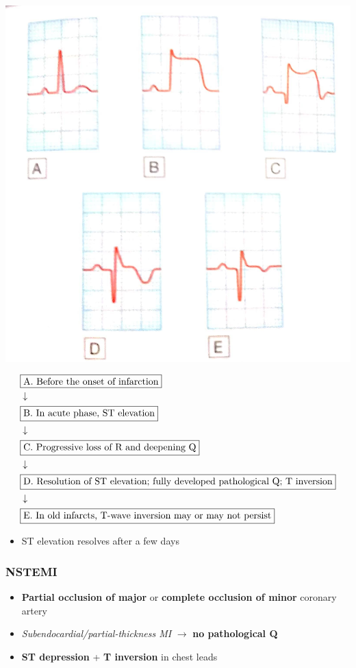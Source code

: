 \documentclass[
  12pt,
]{memoir}
\providecommand{\tightlist}{%
  \setlength{\itemsep}{0pt}\setlength{\parskip}{0pt}}
\begin{document}
\includegraphics[width=.5\textwidth]{../assets/med/STEMI.jpg}

\[
\begin{aligned}
&\fbox{A. Before the onset of infarction}\\
&\downarrow\\
&\fbox{B. In acute phase, ST elevation}\\
&\downarrow\\
&\fbox{C. Progressive loss of R and deepening Q}\\
&\downarrow\\
&\fbox{D. Resolution of ST elevation; fully developed pathological Q;
T inversion}\\
&\downarrow\\
&\fbox{E. In old infarcts, T-wave inversion may or may not persist}\\
\end{aligned}
\]

\begin{itemize}
\tightlist
\item
  ST elevation resolves after a few days
\end{itemize}

\pagebreak

\hypertarget{nstemi}{%
\subsubsection{NSTEMI}\label{nstemi}}

\begin{itemize}
\tightlist
\item
  \textbf{Partial occlusion of major} or \textbf{complete occlusion of
  minor} coronary artery
\item
  \emph{Subendocardial/partial-thickness MI} \(\rightarrow\) \textbf{no
  pathological Q}
\item
  \textbf{ST depression} + \textbf{T inversion} in chest leads
\end{itemize}
\end{document}
